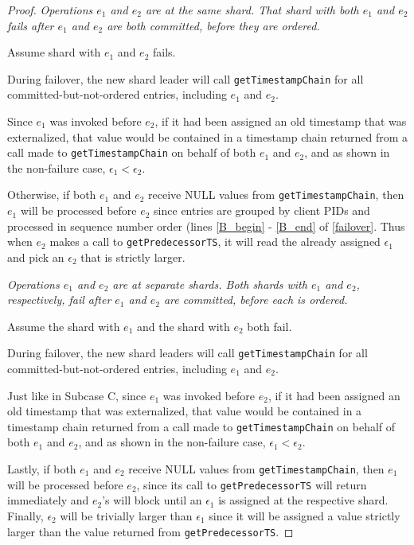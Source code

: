 \begin{proof}
 \textit{Operations $e_1$ and $e_2$ are at the same shard. That shard with both $e_1$ and $e_2$ fails after $e_1$ and $e_2$ are both \textit{committed}, before they are \textit{ordered}.}

Assume shard with $e_1$ and $e_2$ fails.

During failover, the new shard leader will call \texttt{getTimestampChain} for all committed-but-not-ordered entries, including $e_1$ and $e_2$.

Since $e_1$ was invoked before $e_2$, if it had been assigned an old timestamp that was externalized, that value would be contained in a timestamp chain returned from a call made to \texttt{getTimestampChain} on behalf of both $e_1$ and $e_2$, and as shown in the non-failure case, $\epsilon_1 < \epsilon_2$. 

Otherwise, if both $e_1$ and $e_2$ receive NULL values from \texttt{getTimestampChain}, then $e_1$ will be processed before $e_2$ since entries are grouped by client PIDs and processed in sequence number order (lines \ref{B_begin} - \ref{B_end} of \ref{failover}. Thus when $e_2$ makes a call to \texttt{getPredecessorTS}, it will read the already assigned $\epsilon_1$ and pick an $\epsilon_2$ that is strictly larger.

 \textit{Operations $e_1$ and $e_2$ are at separate shards. Both shards with $e_1$ and $e_2$, respectively, fail after $e_1$ and $e_2$ are \textit{committed}, before each is \textit{ordered}.}

Assume the shard with $e_1$ and the shard with $e_2$ both fail.

During failover, the new shard leaders will call \texttt{getTimestampChain} for all committed-but-not-ordered entries, including $e_1$ and $e_2$.

Just like in Subcase C, since $e_1$ was invoked before $e_2$, if it had been assigned an old timestamp that was externalized, that value would be contained in a timestamp chain returned from a call made to \texttt{getTimestampChain} on behalf of both $e_1$ and $e_2$, and as shown in the non-failure case, $\epsilon_1 < \epsilon_2$. 

Lastly, if both $e_1$ and $e_2$ receive NULL values from \texttt{getTimestampChain}, then $e_1$ will be processed before $e_2$, since its call to \texttt{getPredecessorTS} will return immediately and $e_2$'s will block until an $\epsilon_1$ is assigned at the respective shard. Finally, $\epsilon_2$ will be trivially larger than $\epsilon_1$ since it will be assigned a value strictly larger than the value returned from \texttt{getPredecessorTS}.


\end{proof}
